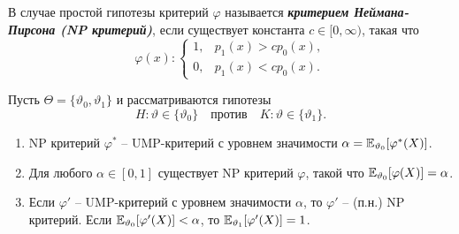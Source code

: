 \begin{defn}
	В случае простой гипотезы критерий $\varphi$ называется \textbf{\textit{критерием Неймана-Пирсона (NP критерий)}}, если существует константа $c \in [0,\infty )$, такая что
	\[ \varphi(x):
	\left \{
	\begin{array}{cl}
	1, & p_1(x) > cp_0(x), \\
	0, & p_1(x) < cp_0(x).
	\end{array}
	\right.
	\]
\end{defn}

\begin{thm}
	Пусть $\Theta = \{ \vartheta_0, \vartheta_1 \}$ и рассматриваются гипотезы
	\[ H:\vartheta \in \{\vartheta_0 \}\quad \text{против} \quad K:\vartheta \in \{\vartheta_1 \}. \]
	\begin{enumerate}
		\item NP критерий $\varphi^*$ -- UMP-критерий с уровнем значимости $\alpha = \mathbb{E}_{\vartheta_0}[\varphi^*(X)]$.
		\item Для любого $\alpha \in [0, 1]$ существует NP критерий $\varphi$, такой что $\mathbb{E}_{\vartheta_0}[\varphi(X)] = \alpha$.
		\item Если $\varphi'$ -- UMP-критерий с уровнем значимости $\alpha$, то $\varphi'$ -- (п.н.) NP критерий. Если $\mathbb{E}_{\vartheta_0}[\varphi'(X)] < \alpha$, то $\mathbb{E}_{\vartheta_1}[\varphi'(X)]=1$.
	\end{enumerate}
\end{thm}
